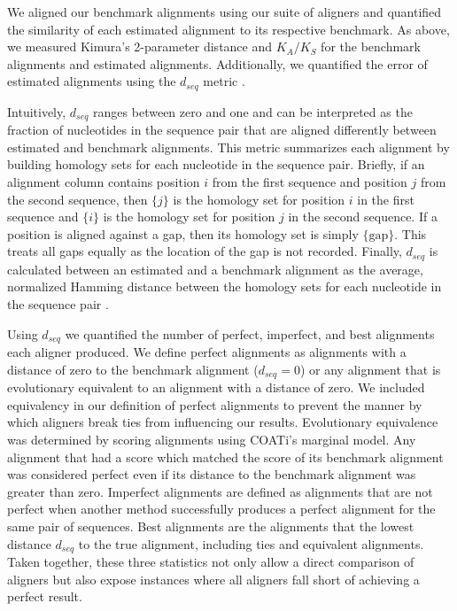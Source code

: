 \documentclass[12pt,letterpaper]{article}
\begin{document}
We aligned our benchmark alignments using our suite of aligners and quantified the similarity of each estimated alignment to its respective benchmark. As above, we measured Kimura's 2-parameter distance \citep{kimura1980simple} and $K_A/K_S$ \citep{ka_ks_li_1993} for the benchmark alignments and estimated alignments. Additionally, we quantified the error of estimated alignments using the $d_{seq}$ metric \citep{metrics_blackburne_whelan_2011}.

Intuitively, $d_{seq}$ ranges between zero and one and can be interpreted as the fraction of nucleotides in the sequence pair that are aligned differently between estimated and benchmark alignments. This metric summarizes each alignment by building homology sets for each nucleotide in the sequence pair. Briefly, if an alignment column contains position $i$ from the first sequence and position $j$ from the second sequence, then $\{j\}$ is the homology set for position $i$ in the first sequence and $\{i\}$ is the homology set for position $j$ in the second sequence. If a position is aligned against a gap, then its homology set is simply $\{\text{gap}\}$. This treats all gaps equally as the location of the gap is not recorded. Finally, $d_{seq}$ is calculated  between an estimated and a benchmark alignment as the average, normalized Hamming distance between the homology sets for each nucleotide in the sequence pair \citep{metrics_blackburne_whelan_2011}.

Using $d_{seq}$ we quantified the number of perfect, imperfect, and best alignments each aligner produced. We define perfect alignments as alignments with a distance of zero to the benchmark alignment ($d_{seq} = 0$) or any alignment that is evolutionary equivalent to an alignment with a distance of zero. We included equivalency in our definition of perfect alignments to prevent the manner by which aligners break ties from influencing our results. Evolutionary equivalence was determined by scoring alignments using COATi's marginal model. Any alignment that had a score which matched the score of its benchmark alignment was considered perfect even if its distance to the benchmark alignment was greater than zero.
%
Imperfect alignments are defined as alignments that are not perfect when another method successfully produces a perfect alignment for the same pair of sequences.
%
Best alignments are the alignments that the lowest distance $d_{seq}$ to the true alignment, including ties and equivalent alignments.
%
Taken together, these three statistics not only allow a direct comparison of aligners but also expose instances where all aligners fall short of achieving a perfect result.
\end{document}
